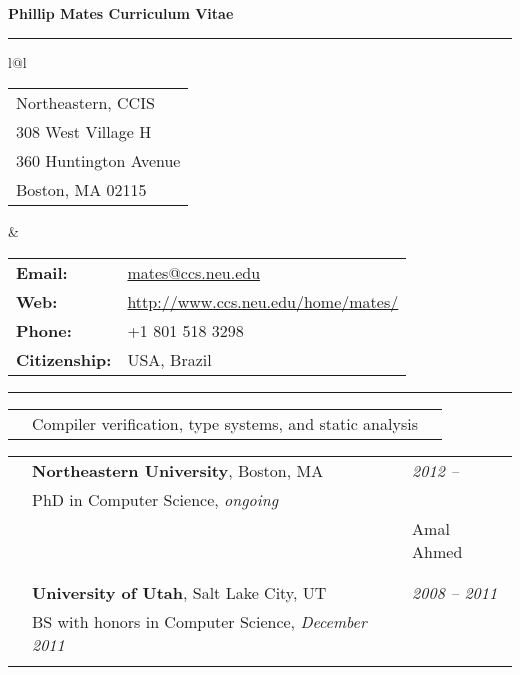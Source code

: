 \documentclass[10pt]{article}
\makeatletter
\newcommand{\category}[2]{
\begin{center}
\vskip 6pt
\begin{tabular*}{\textwidth}{@{}p{0.75in}@{\quad\;\;}p{4in}@{\quad\quad}p{0.7in}}
\vcrush[t]{1in}{\textsc{#1}} &
#2
\end{tabular*}
\end{center}
}
\newcommand{\n}{\\ & }
\newcommand{\nn}{\\ \n}
\newcommand{\DT}[1]{&\hspace{\stretch 1}\textit{#1}}
\newcommand{\ed}[1]{}
\makeatother
\begin{document}


{\LARGE \bf \sc
\noindent Phillip Mates\hspace{\stretch 1}
Curriculum Vitae
}
\vskip 10pt
\hrule


\begin{center}
\vskip -5pt
\begin{tabular*}{\textwidth}{l@{\extracolsep{\fill}}l}

\begin{tabular}[t]{l}
Northeastern, CCIS\\
308 West Village H \\
360 Huntington Avenue \\
Boston, MA 02115\\

\end{tabular} &

\begin{tabular}[t]{ll}
{\small\bf Email:} & {\small \url{mates@ccs.neu.edu}}\\
{\small\bf Web:} & {\small \url{http://www.ccs.neu.edu/home/mates/}}\\
{\small\bf Phone:} & {\small +1 801 518 3298} \\
{\small\bf Citizenship:} & {\small USA, Brazil}
\end{tabular}

\end{tabular*}
\end{center}

\vskip -6pt
\hrule


\category{Research \mbox{interests}}{
Compiler verification, type systems, and static analysis}


\category{Education}{
{\bf Northeastern University}, Boston, MA \DT{\ed{September }2012 -- \ed{current }}\n
PhD in Computer Science, \emph{ongoing}\n
\begin{tabular}{@{}p{0.65in}@{\;\;}l@{}}
  Advisor:&Amal Ahmed\\
\end{tabular}\nn

{\bf University of Utah}, Salt Lake City, UT \DT{\ed{August }2008 -- \ed{December }2011}\n
BS with honors in Computer Science, \emph{December 2011} \n
}
\end{document}
